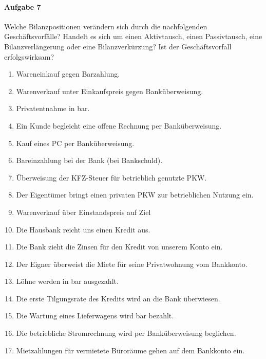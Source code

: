 \documentclass[paper=a4, fontsize=11pt]{scrartcl}
\numberwithin{equation}{section}
\numberwithin{figure}{section}
\numberwithin{table}{section}
\begin{document}
\paragraph{Aufgabe 7}
Welche Bilanzpositionen verändern sich durch die nachfolgenden Geschäftsvorfälle? Handelt es sich um einen Aktivtausch, einen Passivtausch, eine Bilanzverlängerung oder eine Bilanzverkürzung? Ist der Geschäftsvorfall erfolgswirksam? \\
\begin{enumerate}
\item Wareneinkauf gegen Barzahlung.
\item Warenverkauf unter Einkaufspreis gegen Banküberweisung.
\item Privatentnahme in bar.
\item Ein Kunde begleicht eine offene Rechnung per Banküberweisung.
\item Kauf eines PC per Banküberweisung.
\item Bareinzahlung bei der Bank (bei Bankschuld).
\item Überweisung der KFZ-Steuer für betrieblich genutzte PKW.
\item Der Eigentümer bringt einen privaten PKW zur betrieblichen Nutzung ein.
\item Warenverkauf über Einstandspreis auf Ziel
\item Die Hausbank reicht uns einen Kredit aus.
\item Die Bank zieht die Zinsen für den Kredit von unserem Konto ein.
\item Der Eigner überweist die Miete für seine Privatwohnung vom Bankkonto.
\item Löhne werden in bar ausgezahlt.
\item Die erste Tilgungsrate des Kredits wird an die Bank überwiesen.
\item Die Wartung eines Lieferwagens wird bar bezahlt.
\item Die betriebliche Stromrechnung wird per Banküberweisung beglichen.
\item Mietzahlungen für vermietete Büroräume gehen auf dem Bankkonto ein.
\end{enumerate}
\end{document}
